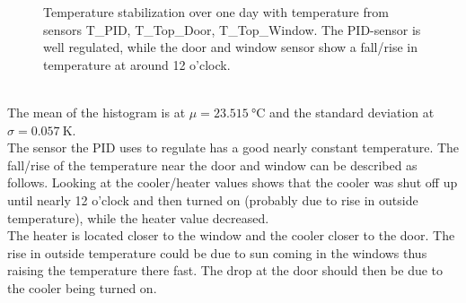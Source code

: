 \documentclass[12pt]{scrartcl}
\begin{document}
\begin{figure}[h!]
          \caption{Temperature stabilization over one day with temperature from
          sensors T\_PID, T\_Top\_Door, T\_Top\_Window. The PID-sensor is well
          regulated, while the door and window sensor show a fall/rise in temperature
          at around 12 o'clock.}
          \label{fig11}
        \end{figure} \\
        The mean of the histogram is at $\mu = 23.515~\text{°C}$ and the standard
        deviation at $\sigma = 0.057~\text{K}$. \\
        The sensor the PID uses to regulate has a good
        nearly constant temperature. The fall/rise of the temperature near
        the door and window can be described as follows. Looking
        at the cooler/heater values shows that the cooler was shut off up
        until nearly 12 o'clock and then turned on (probably due to rise in
        outside temperature), while the heater value decreased. \\
        The heater is located closer to the window and the cooler closer to the
        door.
        The rise in outside temperature could be due to sun coming in the
        windows thus raising the temperature there fast. The drop at the door
        should then be due to the cooler being turned on.
\end{document}
